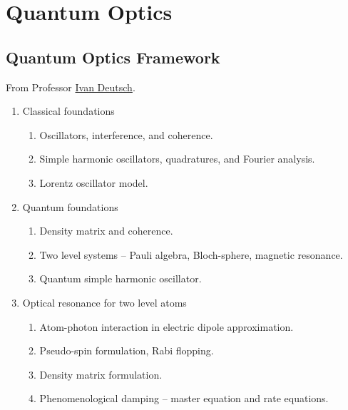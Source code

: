 \documentclass[letterpaper,10pt,english]{sphinxmanual}
\begin{document}
{\section{Quantum Optics}
\label{Quantum/QuantumOptics:quantum-optics}\label{Quantum/QuantumOptics::doc}

\subsection{Quantum Optics Framework}
\label{Quantum/QuantumOptics:quantum-optics-framework}
From Professor \href{http://info.phys.unm.edu/~ideutsch/Classes/Phys566F13/index.htm\#syllabus}{Ivan Deutsch}.
\begin{enumerate}
\item {} 
Classical foundations
\begin{enumerate}
\item {} 
Oscillators, interference, and coherence.

\item {} 
Simple harmonic oscillators, quadratures, and Fourier analysis.

\item {} 
Lorentz oscillator model.

\end{enumerate}

\item {} 
Quantum foundations
\begin{enumerate}
\item {} 
Density matrix and coherence.

\item {} 
Two level systems -- Pauli algebra, Bloch-sphere, magnetic resonance.

\item {} 
Quantum simple harmonic oscillator.

\end{enumerate}

\item {} 
Optical resonance for two level atoms
\begin{enumerate}
\item {} 
Atom-photon interaction in electric dipole approximation.

\item {} 
Pseudo-spin formulation, Rabi flopping.

\item {} 
Density matrix formulation.

\item {} 
Phenomenological damping -- master equation and rate equations.


\end{enumerate}
\end{enumerate}}
\end{document}
